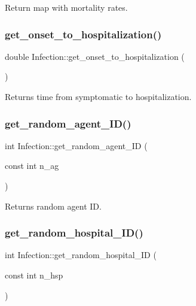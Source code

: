 Return map with mortality rates. 

\mbox{\label{classInfection_a46986a1c5d2f73142033a18b3821f9c9}} 
\subsubsection{\texorpdfstring{get\+\_\+onset\+\_\+to\+\_\+hospitalization()}{get\_onset\_to\_hospitalization()}}
{\footnotesize\ttfamily double Infection\+::get\+\_\+onset\+\_\+to\+\_\+hospitalization (\begin{DoxyParamCaption}{ }\end{DoxyParamCaption})}



Returns time from symptomatic to hospitalization. 

\mbox{\label{classInfection_a2e1f72e35d3364f51f37a3dd485153ae}} 
\subsubsection{\texorpdfstring{get\+\_\+random\+\_\+agent\+\_\+\+I\+D()}{get\_random\_agent\_ID()}}
{\footnotesize\ttfamily int Infection\+::get\+\_\+random\+\_\+agent\+\_\+\+ID (\begin{DoxyParamCaption}\item[{const int}]{n\+\_\+ag }\end{DoxyParamCaption})}



Returns random agent ID. 

\mbox{\label{classInfection_ac6ccfd575ad5f6db803edfd7431aab25}} 
\subsubsection{\texorpdfstring{get\+\_\+random\+\_\+hospital\+\_\+\+I\+D()}{get\_random\_hospital\_ID()}}
{\footnotesize\ttfamily int Infection\+::get\+\_\+random\+\_\+hospital\+\_\+\+ID (\begin{DoxyParamCaption}\item[{const int}]{n\+\_\+hsp }\end{DoxyParamCaption})}



